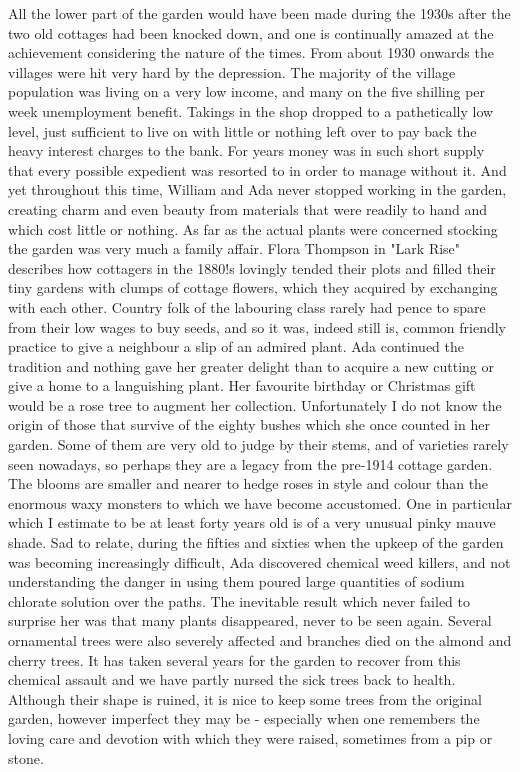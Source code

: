 All the lower part of the garden would have been made during the 1930s after the two old cottages had been knocked down, and one is continually amazed at the achievement considering the nature of the times. From about 1930 onwards the villages were hit very hard by the depression. The majority of the village population was living on a very low income, and many on the five shilling per week unemployment benefit. Takings in the shop dropped to a pathetically low level, just sufficient to live on with little or nothing left over to pay back the heavy interest charges to the bank. For years money was in such short supply that every possible expedient was resorted to in order to manage without it. And yet throughout this time, William and Ada never stopped working in the garden, creating charm and even beauty from materials that were readily to hand and which cost little or nothing. As far as the actual plants were concerned stocking the garden was very much a family affair. Flora Thompson in "Lark Rise" describes how cottagers in the 1880!s lovingly tended their plots and filled their tiny gardens with clumps of cottage flowers, which they acquired by exchanging with each other. Country folk of the labouring class rarely had pence to spare from their low wages to buy seeds, and so it was, indeed still is, common friendly practice to give a neighbour a slip of an admired plant. Ada continued the tradition and nothing gave her greater delight than to acquire a new cutting or give a home to a languishing plant. Her favourite birthday or Christmas gift would be a rose tree to augment her collection. Unfortunately I do not know the origin of those that survive of the eighty bushes which she once counted in her garden. Some of them are very old to judge by their stems, and of varieties rarely seen nowadays, so perhaps they are a legacy from the pre-1914 cottage garden. The blooms are smaller and nearer to hedge roses in style and colour than the enormous waxy monsters to which we have become accustomed. One in particular which I estimate to be at least forty years old is of a very unusual pinky mauve shade. Sad to relate, during the fifties and sixties when the upkeep of the garden was becoming increasingly difficult, Ada discovered chemical weed killers, and not understanding the danger in using them poured large quantities of sodium chlorate solution over the paths. The inevitable result which never failed to surprise her was that many plants disappeared, never to be seen again. Several ornamental trees were also severely affected and branches died on the almond and cherry trees. It has taken several years for the garden to recover from this chemical assault and we have partly nursed the sick trees back to health. Although their shape is ruined, it is nice to keep some trees from the original garden, however imperfect they may be - especially when one remembers the loving care and devotion with which they were raised, sometimes from a pip or stone.

